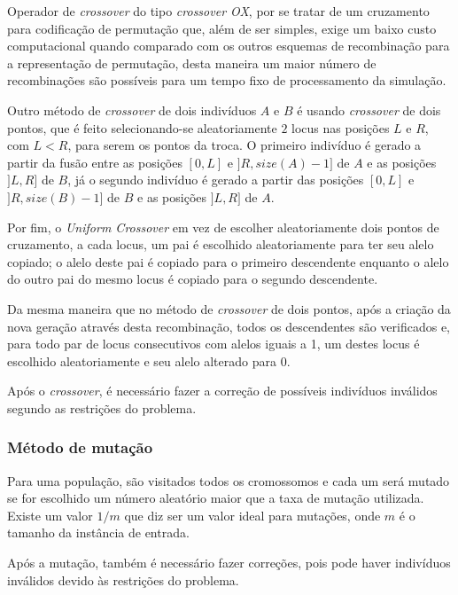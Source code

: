 \documentclass[12pt,a4paper]{article}
\begin{document}
        Operador de \textit{crossover} do tipo \emph{crossover OX}, por se tratar de um cruzamento para codificação de permutação que, além de ser simples, exige um baixo custo computacional
        quando comparado com os outros esquemas de recombinação para a representação de permutação, desta maneira um maior número de recombinações são possíveis para um tempo fixo de processamento
        da simulação. 

        Outro método de \textit{crossover} de dois indivíduos $A$ e $B$ é usando \textit{crossover} de dois pontos, que é feito selecionando-se aleatoriamente $2$ locus nas posições $L$ e $R$,
        com $L < R$, para serem os pontos da troca.  O primeiro indivíduo é gerado a partir da fusão entre as posições $[0, L]$ e $]R, size(A) - 1]$ de $A$ e as posições $]L, R]$ de $B$, já
        o segundo indivíduo é gerado a partir das posições $[0, L]$ e $]R, size(B) - 1]$ de $B$ e as posições $]L, R]$ de $A$.

        Por fim, o \textit{Uniform Crossover} em vez de escolher aleatoriamente dois pontos de cruzamento, a cada locus, um pai é escolhido aleatoriamente para ter seu alelo copiado; o alelo
        deste pai é copiado para o primeiro descendente enquanto o alelo do outro pai do mesmo locus é copiado para o segundo descendente.

        Da mesma maneira que no método de \textit{crossover} de dois pontos, após a criação da nova geração através desta recombinação, todos os descendentes são verificados e, para todo par de locus
        consecutivos com alelos iguais a 1, um destes locus é escolhido aleatoriamente e seu alelo alterado para 0.

        Após o \textit{crossover}, é necessário fazer a correção de possíveis indivíduos inválidos segundo as restrições do problema.

    \subsubsection{Método de mutação}

         Para uma população, são visitados todos os cromossomos e cada um será mutado se for escolhido um número aleatório maior que a taxa de mutação utilizada. Existe um valor $1/m$
         \cite{gendreau2010handbook} que diz ser um valor ideal para mutações, onde $m$ é o tamanho da instância de entrada.
         
        Após a mutação, também é necessário fazer correções, pois pode haver indivíduos inválidos devido às restrições do problema.
\end{document}
